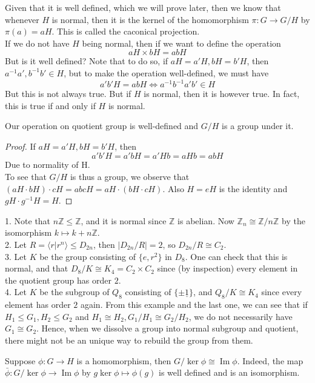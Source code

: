 Given that it is well defined, which we will prove later, then we know that whenever $H$ is normal, then it is the kernel of the homomorphism $\pi: G\to G/H$ by $\pi(a)=aH$.
This is called the caconical projection.\\
If we do not have $H$ being normal, then if we want to define the operation
$$aH\times bH=abH$$
But is it well defined?
Note that to do so, if $aH=a'H,bH=b'H$, then $a^{-1}a',b^{-1}b'\in H$, but to make the operation well-defined, we must have
$$a'b'H=abH\iff a^{-1}b^{-1}a'b'\in H$$
But this is not always true.
But if $H$ is normal, then it is however true.
In fact, this is true if and only if $H$ is normal.
\begin{theorem}
    Our operation on quotient group is well-defined and $G/H$ is a group under it.
\end{theorem}
\begin{proof}
    If $aH=a'H,bH=b'H$, then
    $$a'b'H=a'bH=a'Hb=aHb=abH$$
    Due to normality of H.\\
    To see that $G/H$ is thus a group, we observe that $(aH\cdot bH)\cdot cH=abcH=aH\cdot(bH\cdot cH)$.
    Also $H=eH$ is the identity and $gH\cdot g^{-1}H=H$.
\end{proof}
\begin{example}
    1. Note that $n\mathbb Z\le\mathbb Z$, and it is normal since $\mathbb Z$ is abelian.
    Now $\mathbb Z_n\cong \mathbb Z/n\mathbb Z$ by the isomorphism $k\mapsto k+n\mathbb Z$.\\
    2. Let $R=\langle r|r^n\rangle\le D_{2n}$, then $|D_{2n}/R|=2$, so $D_{2n}/R\cong C_2$.\\
    3. Let $K$ be the group consisting of $\{e,r^2\}$ in $D_8$.
    One can check that this is normal, and that $D_8/K\cong K_4=C_2\times C_2$ since (by inspection) every element in the quotient group has order $2$.\\
    4. Let $K$ be the subgroup of $Q_8$ consisting of $\{\pm\underline{1}\}$, and $Q_8/K\cong K_4$ since every element has order $2$ again.
    From this example and the last one, we can see that if $H_1\le G_1,H_2\le G_2$ and $H_1\cong H_2,G_1/H_1\cong G_2/H_2$, we do not necessarily have $G_1\cong G_2$.
    Hence, when we dissolve a group into normal subgroup and quotient, there might not be an unique way to rebuild the group from them.
\end{example}
\begin{theorem}\label{1_isom_thm}
    Suppose $\phi:G\to H$ is a homomorphism, then $G/\ker\phi\cong\operatorname{Im}\phi$.
    Indeed, the map $\bar\phi:G/\ker\phi\to\operatorname{Im}\phi$ by $g\ker\phi\mapsto\phi(g)$ is well defined and is an isomorphism.
\end{theorem}
